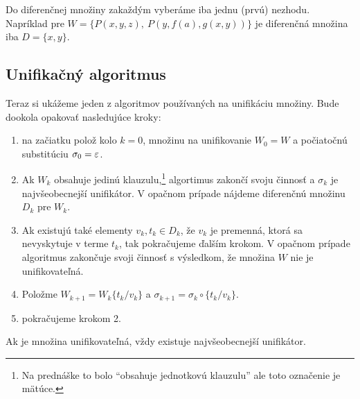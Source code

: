 \begin{poznamka}
    Do diferenčnej množiny zakaždým vyberáme iba jednu (prvú) nezhodu.
    Napríklad pre $W=\{P(x,y,z),\ P(y,f(a),g(x,y))\}$ je diferenčná množina
    iba $D=\{x,y\}$.
\end{poznamka}

\subsection{Unifikačný algoritmus}

Teraz si ukážeme jeden z algoritmov používaných na unifikáciu množiny. Bude
dookola opakovať nasledujúce kroky:
\begin{enumerate}
    \item na začiatku polož kolo $k=0$, množinu na unifikovanie 
        $W_0 = W$ a počiatočnú substitúciu  $\sigma_0 = \varepsilon$.

    \item Ak $W_k$ obsahuje jedinú klauzulu,\footnote{Na prednáške
        to bolo ``obsahuje jednotkovú klauzulu'' ale toto označenie je
        mätúce.} algortimus zakončí svoju činnosť
        a $\sigma_k$ je najvšeobecnejší unifikátor.
        V opačnom prípade nájdeme diferenčnú množinu $D_k$ pre $W_k$.

    \item Ak existujú také elementy $v_k,t_k \in D_k$, že $v_k$ je
        premenná, ktorá sa nevyskytuje v terme $t_k$, tak pokračujeme ďalším
        krokom.
        V opačnom prípade algoritmus zakončuje svoji činnosť
        s výsledkom, že množina $W$ nie je unifikovateľná.

    \item Položme $W_{k+1} = W_k \{t_k/v_k\}$ a
        $\sigma_{k+1} = \sigma_k \circ \{t_k/v_k\}$. 

    \item pokračujeme krokom 2.
\end{enumerate}

\begin{poznamka}
    Ak je množina unifikovateľná, vždy existuje najvšeobecnejší unifikátor.
\end{poznamka}

